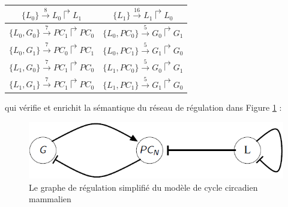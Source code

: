 \documentclass[11pt]{report}
\theoremstyle{definition}
\begin{document}
\begin{table}[ht]
\centering
\begin{tabular}{|c|c|}
\hline 
$\{L_0\}\stackrel{8}{\to}L_0\Rsh L_1$ & $\{L_1\}\stackrel{16}{\to}L_1\Rsh L_0$ \\ 
\hline 
$\{L_0,G_0\}\stackrel{7}{\to}PC_1\Rsh PC_0$ & $\{L_0,PC_0\}\stackrel{5}{\to}G_0\Rsh G_1$ \\ 
\hline 
$\{L_0,G_1\}\stackrel{7}{\to}PC_0\Rsh PC_1$ & $\{L_0,PC_1\}\stackrel{5}{\to}G_1\Rsh G_0$ \\ 
\hline 
$\{L_1,G_0\}\stackrel{7}{\to}PC_1\Rsh PC_0$ & $\{L_1,PC_0\}\stackrel{5}{\to}G_0\Rsh G_1$ \\ 
\hline 
$\{L_1,G_1\}\stackrel{7}{\to}PC_1\Rsh PC_0$ & $\{L_1,PC_1\}\stackrel{5}{\to}G_1\Rsh G_0$ \\ 
\hline 
\end{tabular} 
\end{table}
qui v\'erifie et enrichit la s\'emantique du r\'eseau de r\'egulation dans Figure \ref{mammalpic} :

\begin{figure}[ht]
\centering
\includegraphics[scale=0.6]{mammal.png}
\caption{Le graphe de r\'egulation simplifi\'e du mod\`ele de cycle circadien mammalien}\label{mammalpic}
\end{figure}
\end{document}
